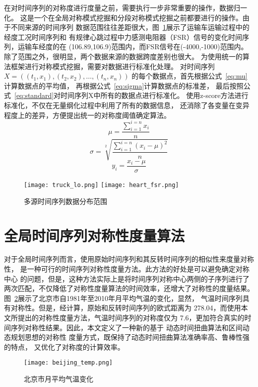 在对时间序列的对称度进行度量之前，需要执行一步非常重要的操作，数据归一化。
这是一个在全局对称模式挖掘和分段对称模式挖掘之前都要进行的操作。由于不同来源的时间序列
数据范围往往差距很大，图~\ref{fig:data_range}展示了运输车运输过程中的经度工况时间序列和
有规律心跳过程中力感测电阻器（FSR）信号的变化时间序列，运输车经度的在
(106.89,106.9)范围内，而FSR信号在(-4000,-1000)范围内。
除了范围之外，很明显，两个数据来源的数据跨度差别也很大。
为使用统一的算法框架进行对称模式挖掘，需要对数据进行标准化处理。
对时间序列$X=\left(\left(t_{1}, x_{1}\right),\left(t_{2}, x_{2}\right), \ldots,\left(t_{n}, x_{n}\right)\right)$
的每个数据点，首先根据公式~\ref{eq:mu}计算数据点的平均值，
再根据公式~\ref{eq:sigma}计算数据点的标准差，
最后按照公式~\ref{eq:standard}对时间序列X中所有的数据点进行标准化。
使用z-score方法进行标准化，不仅在无量纲化过程中利用了所有的数据信息，
还消除了各变量在变异程度上的差异，方便提出统一的对称度阈值确定算法。
\begin{equation}
  \mu=\frac{\sum_{i=1}^{i=n} x_{i}}{n}
  \label{eq:mu}
\end{equation}
\begin{equation}
  \sigma=\sqrt[2]{\frac{\sum_{i=1}^{i=n}\left(x_{i}-\mu\right)^{2}}{n}}
  \label{eq:sigma}
\end{equation}
\begin{equation}
  y_{i}=\frac{x_{i}-\mu}{\sigma}
  \label{eq:standard}
\end{equation}
\begin{figure}
  \centering
  {\texttt{[image: truck\_lo.png]}}
  {\texttt{[image: heart\_fsr.png]}}
  \caption{多源时间序列数据分布范围}
  \label{fig:data_range}
\end{figure}

\section{全局时间序列对称性度量算法}

对于全局时间序列而言，使用原始时间序列和其反转时间序列的相似性来度量对称性，
是一种可行的时间序列对称性度量方法。此方法的好处是可以避免确定对称中心
的问题，但是，这种方法实际上是将时间序列对称中心两侧的子序列进行了
两次匹配，不仅降低了对称性度量算法的时间效率，还增大了对称性的度量结果。
图~\ref{fig:beijing_temp}展示了北京市自1981年至2010年月平均气温的变化，显然，
气温时间序列具有对称性。但是，经计算，原始和反转时间序列的欧式距离为
278.04，而使用本文所提出的对称性度量方法，气温时间序列的对称度仅为
7.6，更加符合真实的时间序列对称性结果。因此，本文定义了一种新的基于
动态时间扭曲算法和区间动态规划思想的对称性
度量方式，既保持了动态时间扭曲算法准确率高、鲁棒性强的特点，
又优化了对称度的计算效率。
\begin{figure}
  \centering
  \texttt{[image: beijing\_temp.png]}
  \caption{北京市月平均气温变化}
  \label{fig:beijing_temp}
\end{figure}

